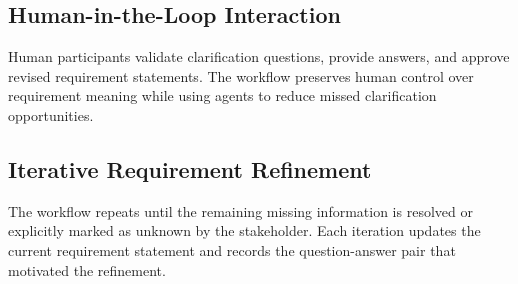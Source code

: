 \subsection{Human-in-the-Loop Interaction}
Human participants validate clarification questions, provide answers, and approve revised requirement statements.
The workflow preserves human control over requirement meaning while using agents to reduce missed clarification opportunities.

\subsection{Iterative Requirement Refinement}
The workflow repeats until the remaining missing information is resolved or explicitly marked as unknown by the stakeholder.
Each iteration updates the current requirement statement and records the question-answer pair that motivated the refinement.
